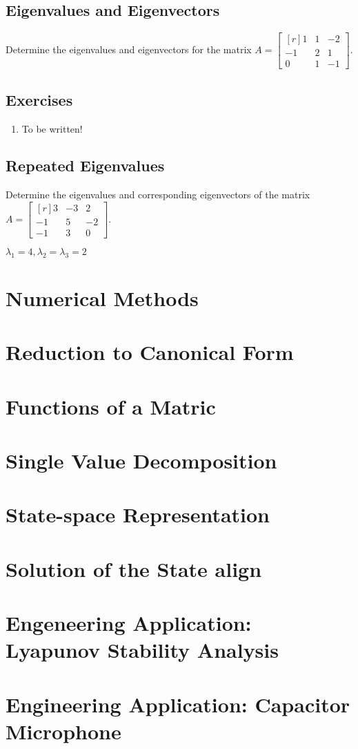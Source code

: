 \documentclass[12pt,a4paper,fleqn]{mycalc}
\begin{document}
	\subsection{Eigenvalues and Eigenvectors}
	\begin{example}
		Determine the eigenvalues and eigenvectors for the matrix \( A=\begin{bmatrix*}[r]
		1 & 1 & -2\\
		-1 & 2 & 1\\
		0 & 1 & -1
		\end{bmatrix*}. \)
	\end{example}
	\subsection{Exercises}
	\begin{enumerate}
		\item To be written!
	\end{enumerate}
	\subsection{Repeated Eigenvalues}
	\begin{example}
		Determine the eigenvalues and corresponding eigenvectors of the matrix 
		\( A =\begin{bmatrix*}[r]
		3 & -3 & 2\\
		-1 & 5 & -2\\
		-1 & 3 & 0
		\end{bmatrix*}. \)
	\end{example}
	\begin{solution}
		\( \lambda_1=4,\lambda_2=\lambda_3=2 \)
	\end{solution}
	\section{Numerical Methods}
	\section{Reduction to Canonical Form}
	\section{Functions of a Matric}
	\section{Single Value Decomposition}
	\section{State-space Representation}
	\section{Solution of the State align}
	\section{Engeneering Application: Lyapunov Stability Analysis}
	\section{Engineering Application: Capacitor Microphone}
\end{document}
